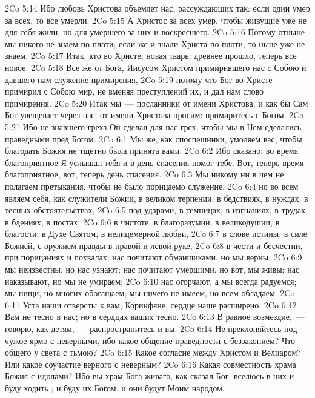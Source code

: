 \vs 2Co 5:14 Ибо любовь Христова объемлет нас, рассуждающих так: если один умер за всех, то все умерли.
\vs 2Co 5:15 А Христос за всех умер, чтобы живущие уже не для себя жили, но для умершего за них и воскресшего.
\vs 2Co 5:16 Потому отныне мы никого не знаем по плоти; если же и знали Христа по плоти, то ныне уже не знаем.
\vs 2Co 5:17 Итак, кто во Христе,  новая тварь; древнее прошло, теперь все новое.
\vs 2Co 5:18 Все же от Бога, Иисусом Христом примирившего нас с Собою и давшего нам служение примирения,
\vs 2Co 5:19 потому что Бог во Христе примирил с Собою мир, не вменяя  преступлений их, и дал нам слово примирения.
\vs 2Co 5:20 Итак мы~--- посланники от имени Христова, и как бы Сам Бог увещевает через нас; от имени Христова просим: примиритесь с Богом.
\vs 2Co 5:21 Ибо не знавшего греха Он сделал для нас  грех, чтобы мы в Нем сделались праведными пред Богом.
\vs 2Co 6:1 Мы же, как споспешники, умоляем вас, чтобы благодать Божия не тщетно была принята вами.
\vs 2Co 6:2 Ибо сказано: во время благоприятное Я услышал тебя и в день спасения помог тебе. Вот, теперь время благоприятное, вот, теперь день спасения.
\vs 2Co 6:3 Мы никому ни в чем не полагаем претыкания, чтобы не было порицаемо служение,
\vs 2Co 6:4 но во всем являем себя, как служители Божии, в великом терпении, в бедствиях, в нуждах, в тесных обстоятельствах,
\vs 2Co 6:5 под ударами, в темницах, в изгнаниях, в трудах, в бдениях, в постах,
\vs 2Co 6:6 в чистоте, в благоразумии, в великодушии, в благости, в Духе Святом, в нелицемерной любви,
\vs 2Co 6:7 в слове истины, в силе Божией, с оружием правды в правой и левой руке,
\vs 2Co 6:8 в чести и бесчестии, при порицаниях и похвалах: нас почитают обманщиками, но мы верны;
\vs 2Co 6:9 мы неизвестны, но нас узнают; нас почитают умершими, но вот, мы живы; нас наказывают, но мы не умираем;
\vs 2Co 6:10 нас огорчают, а мы всегда радуемся; мы нищи, но многих обогащаем; мы ничего не имеем, но всем обладаем.
\rsbpar\vs 2Co 6:11 Уста наши отверсты к вам, Коринфяне, сердце наше расширено.
\vs 2Co 6:12 Вам не тесно в нас; но в сердцах ваших тесно.
\vs 2Co 6:13 В равное возмездие,~--- говорю, как детям,~--- распространитесь и вы.
\rsbpar\vs 2Co 6:14 Не преклоняйтесь под чужое ярмо с неверными, ибо какое общение праведности с беззаконием? Что общего у света с тьмою?
\vs 2Co 6:15 Какое согласие между Христом и Велиаром? Или какое соучастие верного с неверным?
\vs 2Co 6:16 Какая совместность храма Божия с идолами? Ибо вы храм Бога живаго, как сказал Бог: вселюсь в них и буду ходить ; и буду их Богом, и они будут Моим народом.
